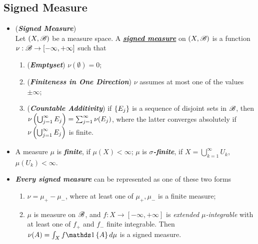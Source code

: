 \documentclass[11pt]{article}
\begin{document}
\subsection{Signed Measure}
\begin{itemize}
\item \begin{definition} (\emph{\textbf{Signed Measure}})\\
Let $(X, {\mathscr B})$ be a measure space. A \underline{\emph{\textbf{signed measure}}} on $(X, {\mathscr B})$ is a function $\nu: {\mathscr B} \rightarrow [-\infty, +\infty]$ such that 
\begin{enumerate}
\item (\emph{\textbf{Emptyset}}) $\nu(\emptyset)= 0$;
\item (\emph{\textbf{Finiteness in One Direction}}) $\nu$ assumes at most one of the values $\pm \infty$;
\item (\emph{\textbf{Countable Additivity}}) if $\left\{E_{j}\right\}$ is a sequence of disjoint sets in ${\mathscr B}$, then $\nu\left(\bigcup_{j=1}^{\infty}E_{j}\right)= \sum_{j=1}^{\infty}\nu(E_{j})$, where the latter converges absolutely if $\nu\left(\bigcup_{j=1}^{\infty}E_{j}\right)$ is finite.
\end{enumerate} 
\end{definition}

\item \begin{definition}
A measure $\mu$ is \emph{\textbf{finite}}, if $\mu(X)<\infty$; $\mu$ is \emph{\textbf{$\sigma$-finite}}, if $X= \bigcup_{k=1}^{\infty}U_{k}$, $\mu(U_k)<\infty$. 
\end{definition}

\item \begin{remark}
\emph{\textbf{Every  signed measure}} can be represented as one of these two forms 
\begin{enumerate}
\item $\nu = \mu_{+}- \mu_{-}$, where at least one of $\mu_{+}, \mu_{-}$ is a finite measure;
\item $\mu$ is measure on ${\mathscr B}$, and $f: X \rightarrow [-\infty, +\infty]$ is \emph{extended $\mu$-integrable} with at least one of $f_{+}$ and $f_{-}$ finite integrable. Then $\nu(A) = \int_{X}f\ind{A} d\mu $ is a signed measure.
\end{enumerate}
\end{remark}


\end{itemize}
\end{document}

